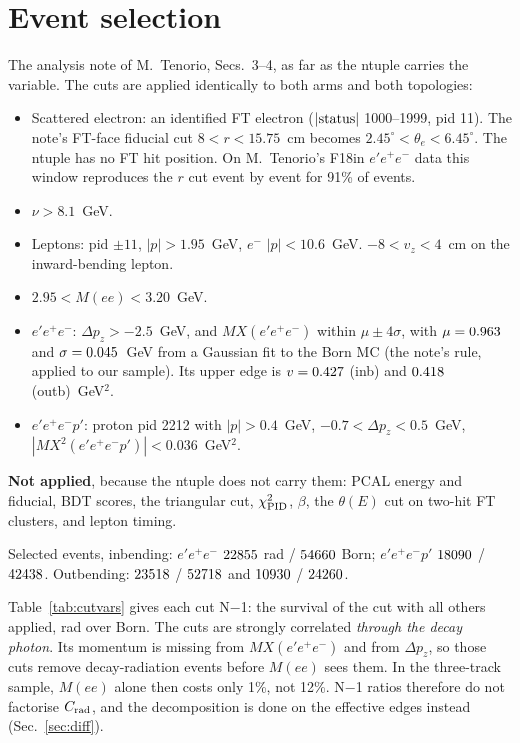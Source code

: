 \documentclass[11pt]{article}
\newcommand{\crad}{C_{\rm rad}}
\begin{document}
\section{Event selection}\label{sec:sel}
The analysis note of M.~Tenorio, Secs.~3--4, as far as the ntuple carries the variable. The cuts are applied identically to both arms and both topologies:
\begin{itemize}
\item Scattered electron: an identified FT electron ($|{\rm status}|$ 1000--1999, pid 11). The note's FT-face fiducial cut
$8<r<15.75$~cm becomes $2.45^\circ<\theta_e<6.45^\circ$. The ntuple has no FT hit position. On M.~Tenorio's F18in
$e'e^+e^-$ data this window reproduces the $r$ cut event by event for 91\% of events.
\item $\nu>8.1$~GeV.
\item Leptons: pid $\pm11$, $|p|>1.95$~GeV, $e^-$ $|p|<10.6$~GeV. $-8<v_z<4$~cm on the inward-bending lepton.
\item $2.95<M(ee)<3.20$~GeV.
\item $e'e^+e^-$: $\Delta p_z>-2.5$~GeV, and $MX(e'e^+e^-)$ within $\mu\pm4\sigma$, with $\mu=0.963$ and $\sigma=0.045$~GeV from a
Gaussian fit to the Born MC (the note's rule, applied to our sample). Its upper edge is $v=0.427$ (inb) and $0.418$ (outb)~GeV$^2$.
\item $e'e^+e^-p'$: proton pid 2212 with $|p|>0.4$~GeV, $-0.7<\Delta p_z<0.5$~GeV, $|MX^2(e'e^+e^-p')|<0.036$~GeV$^2$.
\end{itemize}
\textbf{Not applied}, because the ntuple does not carry them: PCAL energy and fiducial, BDT scores, the triangular cut,
$\chi^2_{\rm PID}$, $\beta$, the $\theta(E)$ cut on two-hit FT clusters, and lepton timing.

Selected events, inbending: $e'e^+e^-$ $22855$ rad / $54660$ Born; $e'e^+e^-p'$ $18090$ / $42438$.
Outbending: $23518$ / $52718$ and $10930$ / $24260$.

Table~\ref{tab:cutvars} gives each cut N$-$1: the survival of the cut with all others applied, rad over Born. The cuts are
strongly correlated \emph{through the decay photon}. Its momentum is missing from $MX(e'e^+e^-)$ and from $\Delta p_z$, so
those cuts remove decay-radiation events before $M(ee)$ sees them. In the three-track sample, $M(ee)$ alone then costs only 1\%,
not 12\%. N$-$1 ratios therefore do not factorise $\crad$, and the decomposition is done on the effective edges
instead (Sec.~\ref{sec:diff}).
\begin{table}[H]\centering\small

\caption{N$-$1 per cut in M.~Tenorio's window ($Q^2$ 0.02--0.12, $W$ 4.15--4.48). $r$ = rad survival / Born survival. A cut that
\texttt{rc\_factor} knows nothing about must give $r=1$ unless radiation acts through it. Lepton PID gives $r=0.991$--$0.996$:
the detector's response to the decay-photon shower next to the lepton.}
\label{tab:cutvars}
\end{table}
\end{document}
